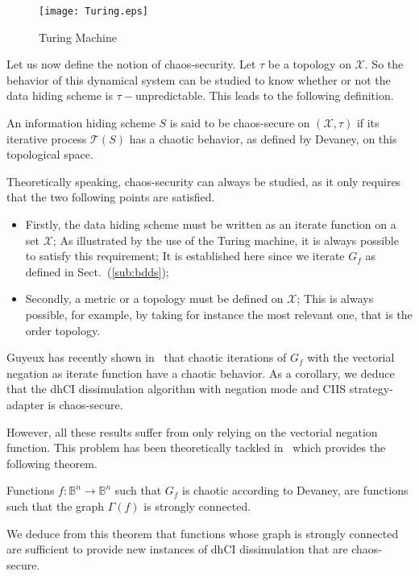 \documentclass{comjnl}
\begin{document}
 \begin{figure}[h!]
   \centering
\texttt{[image: Turing.eps]}
 \caption{Turing Machine}
 \label{Turing}
 \end{figure}


Let us now define the notion of chaos-security.
Let $\tau$ be a topology on $\mathcal{X}$. So the behavior of this dynamical system can be studied to know whether or not the data hiding scheme is $\tau-$unpredictable. This leads to the following definition.

\begin{definition}
\label{DefinitionChaosSecure}
An information hiding scheme $S$ is said to be chaos-secure on $(\mathcal{X},\tau)$ if its iterative process $\mathcal{T}(S)$ has a chaotic behavior, as defined by Devaney, on this topological space.
\end{definition}



Theoretically speaking, chaos-security can always be studied, as it only requires that the two following points are satisfied.
\begin{itemize}
\item Firstly, the data hiding scheme must be written as an iterate function on
  a set $\mathcal{X}$;
As illustrated by the use of the Turing machine, it is always possible to satisfy this requirement; It is established here since we iterate $G_f$ as defined in
Sect.~(\ref{sub:bdds});

\item Secondly, a metric or a topology must be defined on $\mathcal{X}$; This is always possible, for example, by taking for instance the most relevant one, that is the order topology.
\end{itemize}


Guyeux has recently shown in~\cite{GuyeuxThese10}  that chaotic
iterations of $G_f$ with  the
vectorial negation  as  iterate  function 
have   a  chaotic  behavior.
As a corollary, we deduce that the dhCI  dissimulation algorithm 
with negation mode and  CIIS strategy-adapter is chaos-secure.

However, all these results suffer from only relying on the vectorial
negation function. This problem has been theoretically tackled 
in~\cite{GuyeuxThese10} which provides the  following theorem.

\begin{theorem}
\label{Th:Caracterisation des  IC chaotiques} Functions $f  : \mathds{B}^{n} \to
\mathds{B}^{n}$ such that  $G_f$ is chaotic according to  Devaney, are functions
such that the graph $\Gamma(f)$ is strongly connected.
\end{theorem}
\noindent We deduce from this theorem that functions whose  
graph is strongly connected are sufficient to provide new instances of 
dhCI dissimulation that are chaos-secure.
\end{document}
